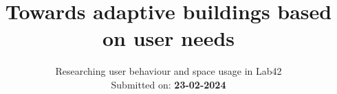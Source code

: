 \title{Towards adaptive buildings based on user needs}
\subtitle{ Researching user behaviour and space usage in Lab42 \\ Submitted on: \textbf{23-02-2024}}